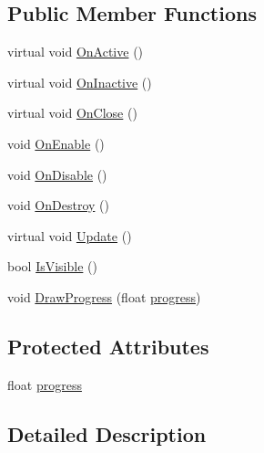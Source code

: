 \subsection*{Public Member Functions}
\begin{DoxyCompactItemize}
\item 
virtual void \hyperlink{class_unity_editor_1_1_editor_window_ext_ad9aa611093b7e77a1243e068f7ea395c}{On\+Active} ()
\item 
virtual void \hyperlink{class_unity_editor_1_1_editor_window_ext_a572531a15f2a6f28cf8f359580a313a1}{On\+Inactive} ()
\item 
virtual void \hyperlink{class_unity_editor_1_1_editor_window_ext_acdbfacca55bb0cb8b61908e75af22f28}{On\+Close} ()
\item 
void \hyperlink{class_unity_editor_1_1_editor_window_ext_a7445e089cf9b8188879f2705eccab589}{On\+Enable} ()
\item 
void \hyperlink{class_unity_editor_1_1_editor_window_ext_a25da64bd2442d8c4cb7668c06edce6b8}{On\+Disable} ()
\item 
void \hyperlink{class_unity_editor_1_1_editor_window_ext_a48278019e7723fe8c04e1e042d65330e}{On\+Destroy} ()
\item 
virtual void \hyperlink{class_unity_editor_1_1_editor_window_ext_aaa95c1215e9d733e51018f7bc545da1b}{Update} ()
\item 
bool \hyperlink{class_unity_editor_1_1_editor_window_ext_a409274f09502cedd6a68829d969a02ff}{Is\+Visible} ()
\item 
void \hyperlink{class_unity_editor_1_1_editor_window_ext_a83716f8151839437125892e6408c2daa}{Draw\+Progress} (float \hyperlink{class_unity_editor_1_1_editor_window_ext_ad4fc5cfe734a2117bf611005da84573e}{progress})
\end{DoxyCompactItemize}
\subsection*{Protected Attributes}
\begin{DoxyCompactItemize}
\item 
float \hyperlink{class_unity_editor_1_1_editor_window_ext_ad4fc5cfe734a2117bf611005da84573e}{progress}
\end{DoxyCompactItemize}


\subsection{Detailed Description}


